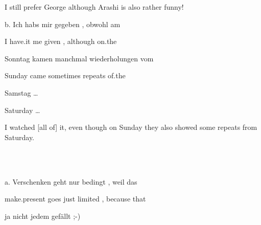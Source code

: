 \begin{styleMoutonExamplesTransAlpha}
I still prefer George although Arashi is also rather funny!
\end{styleMoutonExamplesTransAlpha}

\begin{styleMoutonExampleAlpha}
b.  Ich  habs    mir  gegeben  ,  obwohl  am
\end{styleMoutonExampleAlpha}

\begin{styleMoutonExampleAlphaGloss}
I  have.it  me  given    ,  although  on.the
\end{styleMoutonExampleAlphaGloss}

\begin{styleMoutonExampleAlphaGloss}
Sonntag kamen  manchmal    wiederholungen  vom  
\end{styleMoutonExampleAlphaGloss}

\begin{styleMoutonExampleAlphaGloss}
Sunday  came  sometimes    repeats    of.the  
\end{styleMoutonExampleAlphaGloss}

\begin{styleMoutonExampleAlphaGloss}
Samstag  …
\end{styleMoutonExampleAlphaGloss}

\begin{styleMoutonExampleAlphaGloss}
Saturday  …
\end{styleMoutonExampleAlphaGloss}

\begin{styleMoutonExamplesTransAlpha}
I watched [all of] it, even though on Sunday they also showed some re\-peats from Saturday.
\end{styleMoutonExamplesTransAlpha}

\begin{styleMoutonExample}
\ea%
    \label{ex:key:2}
    \gll\\
        \\
    \glt
    \z

          a.  Verschenken  geht  nur  bedingt  ,  weil    das
\end{styleMoutonExample}

\begin{styleMoutonExampleAlphaGloss}
make.present  goes  just  limited  ,  because  that
\end{styleMoutonExampleAlphaGloss}

\begin{styleMoutonExampleAlphaGloss}
ja  nicht    jedem  gefällt  ;-)
\end{styleMoutonExampleAlphaGloss}

